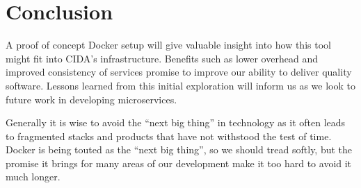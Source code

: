 \documentclass[twocolumn]{article}
\begin{document}
\section{Conclusion}

A proof of concept Docker setup will give valuable insight into how this tool might fit into CIDA's infrastructure.
Benefits such as lower overhead and improved consistency of services promise to improve our ability to deliver quality software.
Lessons learned from this initial exploration will inform us as we look to future work in developing microservices.

\par
Generally it is wise to avoid the ``next big thing'' in technology as it often leads to fragmented stacks and products that have not withstood the test of time.
Docker is being touted as the ``next big thing'', so we should tread softly, but the promise it brings for many areas of our development make it too hard to avoid it much longer.

\onecolumn


\end{document}
